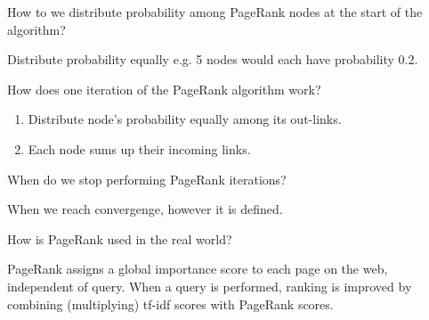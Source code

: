 \documentclass[2by4,grid]{flashcards}
\begin{document}
\begin{flashcard}{How to we distribute probability among PageRank nodes at the start of the algorithm?}
	\begin{center}
        Distribute probability equally e.g. 5 nodes would each have probability 0.2.
	\end{center}
\end{flashcard}

\begin{flashcard}{How does one iteration of the PageRank algorithm work?}
	\begin{center}
        \begin{enumerate}
            \item Distribute node's probability equally among its out-links.
            \item Each node sums up their incoming links.
        \end{enumerate}
	\end{center}
\end{flashcard}

\begin{flashcard}{When do we stop performing PageRank iterations?}
	\begin{center}
        When we reach convergenge, however it is defined.
	\end{center}
\end{flashcard}

\begin{flashcard}{How is PageRank used in the real world?}
	\begin{center}
        PageRank assigns a global importance score to each page on the web, independent of query. When a query is performed, ranking is improved by combining (multiplying) tf-idf scores with PageRank scores.
	\end{center}
\end{flashcard}
\end{document}
